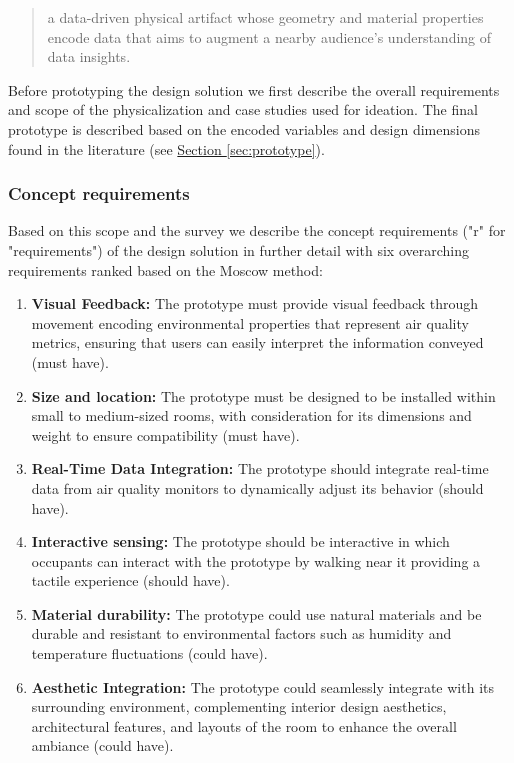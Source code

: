 \begin{quote}
a data-driven physical artifact whose geometry and material properties encode data that aims to augment a nearby audience’s understanding of data insights.
\end{quote}

Before prototyping the design solution we first describe the overall requirements and scope of the physicalization and case studies used for ideation. The final prototype is described based on the encoded variables and design dimensions found in the literature (see \hyperref[sec:prototype]{Section \ref*{sec:prototype}}).

\subsubsection{Concept requirements}

Based on this scope and the survey we describe the concept requirements ("r" for "requirements") of the design solution in further detail with six overarching requirements ranked based on the Moscow method:

\begin{enumerate}
    \renewcommand{\labelenumi}{R\arabic{enumi}:}
    \item \textbf{Visual Feedback:} The prototype must provide visual feedback through movement encoding environmental properties that represent air quality metrics, ensuring that users can easily interpret the information conveyed (must have).
    \item \textbf{Size and location:} The prototype must be designed to be installed within small to medium-sized rooms, with consideration for its dimensions and weight to ensure compatibility (must have).
    \item \textbf{Real-Time Data Integration:} The prototype should integrate real-time data from air quality monitors to dynamically adjust its behavior (should have).
    \item \textbf{Interactive sensing:} The prototype should be interactive in which occupants can interact with the prototype by walking near it providing a tactile experience (should have).
    \item \textbf{Material durability:} The prototype could use natural materials and be durable and resistant to environmental factors such as humidity and temperature fluctuations (could have).
    \item \textbf{Aesthetic Integration:} The prototype could seamlessly integrate with its surrounding environment, complementing interior design aesthetics, architectural features, and layouts of the room to enhance the overall ambiance (could have).
\end{enumerate}

